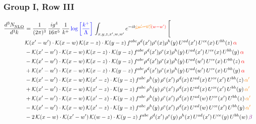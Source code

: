 \documentclass[9pt]{article}
\numberwithin{equation}{section}
\begin{document}
\subsubsection{Group I, Row III}
\begin{align}
    \frac{d^{3}N_{\rm NLO}^{\rm}}{d^{3}k}  & = \frac{1}{(2\pi)^{3}}\, \frac{ig^{4}}{16\pi^{5}}\, \frac{1}{k^{+}}\, {\color{blue}\log{\left[\frac{k^{+}}{\Lambda}\right]}}\, \int_{x,y,z,x^{\prime},w,w^{\prime}}e^{-ik{\color{orange}\cancel{(w^{\prime}-w)}}{\color{red}(w-w^{\prime})}}\, \Bigg[\notag \\ & \mathcal{K}(x'-w')\cdot \mathcal{K}(x-w)\, \mathcal{K}(x-z)\cdot \mathcal{K}(y-z)\, f^{abc}\rho^{d}(x')\rho^{e}(x)\rho^{h}(y)\, U^{ad}(x')\,U^{ce}(x)\, U^{bh}(z)\,{\color{red} \alpha}\notag\\ & - \mathcal{K}(x'-w')\cdot \mathcal{K}(x-w)\, \mathcal{K}(x-z)\cdot \mathcal{K}(y-z)\, f^{abc}\rho^{d}(x')\rho^{e}(x)\rho^{h}(y)\, U^{ad}(x')\,U^{ce}(x)\, U^{bh}(y)\,{\color{red} \alpha}\notag \\ &-\mathcal{K}(x'-w')\cdot \mathcal{K}(x-w)\, \mathcal{K}(x-z)\cdot \mathcal{K}(y-z)\, f^{abc}\rho^{d}(x')\rho^{e}(x)\rho^{h}(y)\, U^{ad}(w')\,U^{ce}(x)\, U^{bh}(z)\,{\color{red} \alpha}\notag \\ & +\mathcal{K}(x'-w')\cdot \mathcal{K}(x-w)\, \mathcal{K}(x-z)\cdot \mathcal{K}(y-z)\, f^{abc}\rho^{d}(x')\rho^{e}(x)\rho^{h}(y)\, U^{ad}(w')\,U^{ce}(x)\, U^{bh}(y)\,{\color{red} \alpha}\notag \\ & -\mathcal{K}(x'-w')\cdot\mathcal{K}(x-w)\,\mathcal{K}(x'-z)\cdot\mathcal{K}(y-z)\, f^{abc}\,\rho^{h}(y)\,\rho^{e}(x')\,\rho^{d}(x)\,U^{ad}(x)\,U^{ce}(x')\,U^{bh}(z)\,{\color{orange} \alpha'}\notag \\ &+\mathcal{K}(x'-w')\cdot\mathcal{K}(x-w)\,\mathcal{K}(x'-z)\cdot\mathcal{K}(y-z)\, f^{abc}\,\rho^{h}(y)\,\rho^{e}(x')\,\rho^{d}(x)\,U^{ad}(x)\,U^{ce}(x')\,U^{bh}(y)\,{\color{orange} \alpha'}\notag \\ & +\mathcal{K}(x'-w')\cdot\mathcal{K}(x-w)\,\mathcal{K}(x'-z)\cdot\mathcal{K}(y-z)\, f^{abc}\,\rho^{h}(y)\,\rho^{e}(x')\,\rho^{d}(x)\,U^{ad}(w)\,U^{ce}(x')\,U^{bh}(z)\,{\color{orange} \alpha'}\notag \\ & -\mathcal{K}(x'-w')\cdot\mathcal{K}(x-w)\,\mathcal{K}(x'-z)\cdot\mathcal{K}(y-z)\, f^{abc}\,\rho^{h}(y)\,\rho^{e}(x')\,\rho^{d}(x)\,U^{ad}(w)\,U^{ce}(x')\,U^{bh}(y)\,{\color{orange} \alpha'}\notag \\ & -2\,\mathcal{K}(x-w)\cdot\mathcal{K}(x'-w')\,\mathcal{K}(w-z)\cdot\mathcal{K}(y-z)\, f^{abc}\,\rho^{d}(x')\,\rho^{e}(y)\,\rho^{h}(x)\,U^{ad}(x')\,U^{ce}(y)\,U^{bh}(w)\,{\color{violet} \beta}\notag\\

\end{align}
\end{document}
